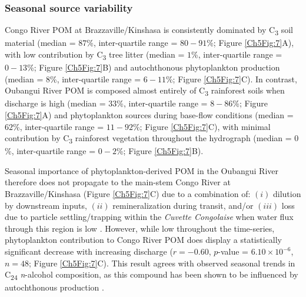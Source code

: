 \subsubsection{Seasonal source variability}

Congo River POM at Brazzaville/Kinshasa is consistently dominated by C\textsubscript{3} soil material (median = $87$\%, inter-quartile range = $80 - 91$\%; Figure \ref{Ch5Fig:7}A), with low contribution by C\textsubscript{3} tree litter (median = $1$\%, inter-quartile range = $0 - 13$\%; Figure \ref{Ch5Fig:7}B) and autochthonous phytoplankton production (median = $8$\%, inter-quartile range = $6 - 11$\%; Figure \ref{Ch5Fig:7}C). In contrast, Oubangui River POM is composed almost entirely of C\textsubscript{3} rainforest soils when discharge is high (median = $33$\%, inter-quartile range = $8 - 86$\%; Figure \ref{Ch5Fig:7}A) and phytoplankton sources during base-flow conditions (median = $62$\%, inter-quartile range = $11 - 92$\%; Figure \ref{Ch5Fig:7}C), with minimal contribution by C\textsubscript{3} rainforest vegetation throughout the hydrograph (median = $0$\%, inter-quartile range = $0 - 2$\%; Figure \ref{Ch5Fig:7}B). 

Seasonal importance of phytoplankton-derived POM in the Oubangui River therefore does not propagate to the main-stem Congo River at Brazzaville/Kinshasa (Figure \ref{Ch5Fig:7}C) due to a combination of: $(i)$ dilution by downstream inputs, $(ii)$ remineralization during transit, and/or $(iii)$ loss due to particle settling/trapping within the \textit{Cuvette Congolaise} when water flux through this region is low \citep{Laraque:2009fz}. However, while low throughout the time-series, phytoplankton contribution to Congo River POM does display a statistically significant decrease with increasing discharge ($r = -0.60$, $p$-value = $6.10 \times 10^{-6}$, $n = 48$; Figure \ref{Ch5Fig:7}C). This result agrees with observed seasonal trends in C\textsubscript{24} \textit{n}-alcohol  composition, as this compound has been shown to be influenced by autochthonous production \citep{Hemingway:2016bq}.

